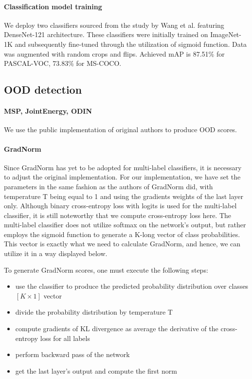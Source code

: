 \paragraph{Classification model training}
We deploy two classifiers sourced from the study by Wang et al.\cite{Wang2021} featuring DenseNet-121 architecture. 
These classifiers were initially trained on ImageNet-1K and subsequently fine-tuned through the utilization of sigmoid function.
Data was augmented with random crops and flips. 
Achieved mAP is 87.51\% for PASCAL-VOC, 73.83\% for MS-COCO. 

\subsection{OOD detection}
\paragraph{MSP, JointEnergy, ODIN}
We use the public implementation of original authors to produce OOD scores. 

\paragraph{GradNorm}
Since GradNorm has yet to be adopted for multi-label classifiers, it is necessary to adjust the original implementation. 
For our implementation, we have set the parameters in the same fashion as the authors of GradNorm did, with temperature T being equal to 1 and using the gradients weights of the last layer only. 
Although binary cross-entropy loss with logits is used for the multi-label classifier, it is still noteworthy that we compute cross-entropy loss here. 
The multi-label classifier does not utilize softmax on the network's output, but rather employs the sigmoid function to generate a K-long vector of class probabilities. 
This vector is exactly what we need to calculate GradNorm, and hence, we can utilize it in a way displayed below.

\noindent To generate GradNorm scores, one must execute the following steps:
\begin{itemize}
    \itemsep0em 
    \item use the classifier to produce the predicted probability distribution over classes $[K \times 1]$ vector
    \item divide the probability distribution by temperature T
    \item compute gradients of KL divergence as average the derivative of the cross-entropy loss for all labels
    \item perform backward pass of the network
    \item get the last layer's output and compute the first norm
\end{itemize}

